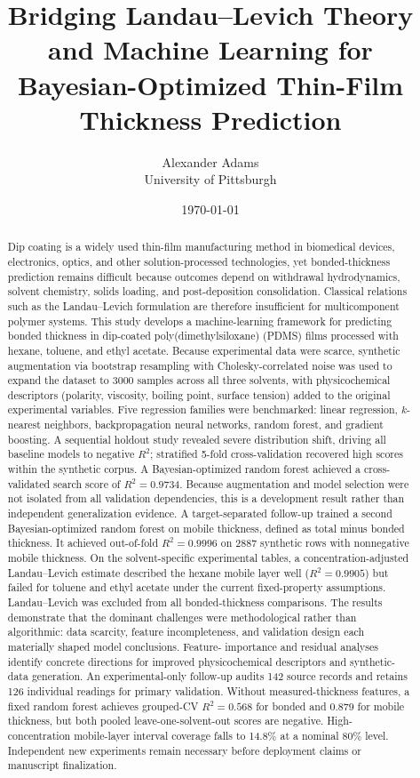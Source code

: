\documentclass[11pt]{article}
\title{Bridging Landau--Levich Theory and Machine Learning for
Bayesian-Optimized Thin-Film Thickness Prediction}
\author{Alexander Adams \\ \small University of Pittsburgh}
\date{\today}
\begin{document}
\maketitle

\begin{abstract}
Dip coating is a widely used thin-film manufacturing method in biomedical
devices, electronics, optics, and other solution-processed technologies,
yet bonded-thickness prediction remains difficult because outcomes depend
on withdrawal hydrodynamics, solvent chemistry, solids loading, and
post-deposition consolidation. Classical relations such as the
Landau--Levich formulation are therefore insufficient for multicomponent
polymer systems. This study develops a machine-learning framework for predicting bonded thickness in dip-coated poly(dimethyl\-siloxane) (PDMS) films processed with hexane, toluene, and ethyl acetate. Because experimental data were
scarce, synthetic augmentation via bootstrap resampling with
Cholesky-correlated noise was used to expand the dataset to 3000 samples
across all three solvents, with physicochemical descriptors (polarity,
viscosity, boiling point, surface tension) added to the original
experimental variables. Five regression families were benchmarked: linear regression,
$k$-nearest neighbors, backpropagation neural networks, random forest,
and gradient boosting. A sequential holdout study revealed severe
distribution shift, driving all baseline models to negative $R^2$;
stratified 5-fold cross-validation recovered high scores within the
synthetic corpus. A Bayesian-optimized random forest achieved a
cross-validated search score of $R^2 = 0.9734$. Because augmentation and
model selection were not isolated from all validation dependencies,
this is a development result rather than independent generalization evidence.
A target-separated follow-up trained a second Bayesian-optimized random
forest on mobile thickness, defined as total minus bonded thickness. It
achieved out-of-fold $R^2 = 0.9996$ on 2887 synthetic rows with nonnegative
mobile thickness. On the solvent-specific experimental tables, a concentration-adjusted
Landau--Levich estimate described the hexane mobile layer well
($R^2 = 0.9905$) but failed for toluene and ethyl acetate under the current
fixed-property assumptions. Landau--Levich was excluded from all
bonded-thickness comparisons.
The results demonstrate that the dominant challenges were methodological
rather than algorithmic: data scarcity, feature incompleteness, and
validation design each materially shaped model conclusions. Feature-
importance and residual analyses identify concrete directions for
improved physicochemical descriptors and synthetic-data generation.
An experimental-only follow-up audits 142 source records and retains 126
individual readings for primary validation. Without measured-thickness
features, a fixed random forest achieves grouped-CV $R^2=0.568$ for bonded
and $0.879$ for mobile thickness, but both pooled leave-one-solvent-out
scores are negative. High-concentration mobile-layer interval coverage
falls to 14.8\% at a nominal 80\% level. Independent new experiments remain
necessary before deployment claims or manuscript finalization.
\end{abstract}
\end{document}
